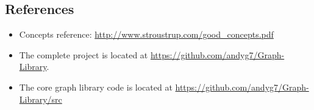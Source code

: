 \documentclass[12pt]{article}
\begin{document}
\subsection{References}
\begin{itemize}
\item Concepts reference: \url{http://www.stroustrup.com/good_concepts.pdf}
\item The complete project is located at \url{https://github.com/andyg7/Graph-Library}.
\item The core graph library code is located at \url{https://github.com/andyg7/Graph-Library/src}
\end{itemize}
\end{document}
